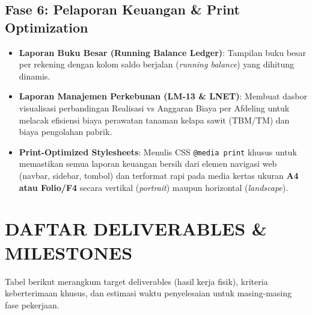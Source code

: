 \documentclass[11pt,a4paper]{article}
\begin{document}
\subsection{Fase 6: Pelaporan Keuangan \& Print Optimization}
\begin{itemize}
    \item \textbf{Laporan Buku Besar (Running Balance Ledger)}: Tampilan buku besar per rekening dengan kolom saldo berjalan (\textit{running balance}) yang dihitung dinamis.
    \item \textbf{Laporan Manajemen Perkebunan (LM-13 \& LNET)}: Membuat dasbor visualisasi perbandingan Realisasi vs Anggaran Biaya per Afdeling untuk melacak efisiensi biaya perawatan tanaman kelapa sawit (TBM/TM) dan biaya pengolahan pabrik.
    \item \textbf{Print-Optimized Stylesheets}: Menulis CSS \texttt{@media print} khusus untuk memastikan semua laporan keuangan bersih dari elemen navigasi web (navbar, sidebar, tombol) dan terformat rapi pada media kertas ukuran \textbf{A4 atau Folio/F4} secara vertikal (\textit{portrait}) maupun horizontal (\textit{landscape}).
\end{itemize}

\newpage

\section{DAFTAR DELIVERABLES \& MILESTONES}
Tabel berikut merangkum target deliverables (hasil kerja fisik), kriteria keberterimaan khusus, dan estimasi waktu penyelesaian untuk masing-masing fase pekerjaan.
\end{document}
